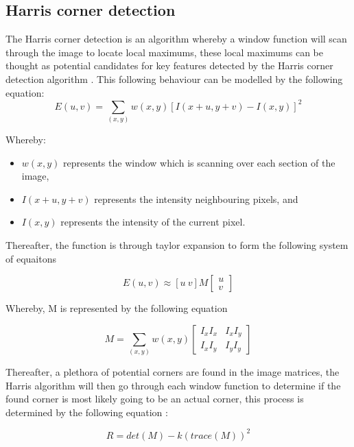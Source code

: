 \documentclass[conference]{IEEEtran}
\begin{document}
\subsection{Harris corner detection} \label{one-theory}
The Harris corner detection is an algorithm whereby a window function will scan through the image to locate local maximums, these local maximums can be thought as potential candidates for key features detected by the Harris corner detection algorithm \cite{b4} \cite{b2}. This following behaviour can be modelled by the following equation:
\begin{equation}
	E(u,v) = \sum\limits_{(x,y)} w(x,y) [I(x + u, y+v) - I(x,y)]^2
\end{equation}

Whereby:
\begin{itemize}
	\item $w(x,y)$ represents the window which is scanning over each section of the image,
	\item $I(x + u, y + v)$ represents the intensity neighbouring pixels, and
	\item $I(x,y)$ represents the intensity of the current pixel.
\end{itemize}

Thereafter, the function is through taylor expansion to form the following system of equaitons

\begin{equation}
	E(u,v) \approx [u\ v] M
	\begin{bmatrix}
	u \\ v
	\end{bmatrix}
\end{equation}

Whereby, M is represented by the following equation

\begin{equation}
	M = \sum\limits_{(x,y)} w(x,y)
	\begin{bmatrix}
		I_{x} I_{x} & I_{x} I_{y} \\
		I_{x} I_{y} & I_{y} I_{y}
	\end{bmatrix}
\end{equation}

Thereafter, a plethora of potential corners are found in the image matrices, the Harris algorithm will then go through each window function to determine if the found corner is most likely going to be an actual corner, this process is determined by the following equation \cite{b2}:

\begin{equation}
	R = det(M) - k(trace(M))^{2}
\end{equation}
\end{document}
